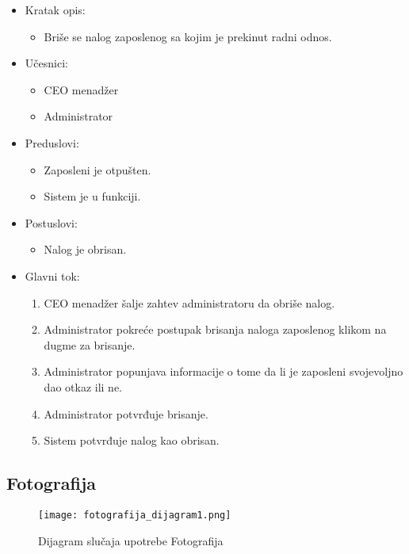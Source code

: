 \documentclass[a4paper]{article}
\begin{document}
\begin{itemize}
    \item Kratak opis: 
    \begin{itemize}
        \item Briše se nalog zaposlenog sa kojim je prekinut radni odnos.
    \end{itemize}
    \item Učesnici:
        \begin{itemize}
        \item CEO menadžer
        \item Administrator
    \end{itemize}
    \item Preduslovi:
        \begin{itemize}
            \item Zaposleni je otpušten.
            \item Sistem je u funkciji.
        \end{itemize}
    \item Postuslovi:
        \begin{itemize}
            \item Nalog je obrisan.
        \end{itemize}
    \item Glavni tok:
        \begin{enumerate}
            \item CEO menadžer šalje zahtev administratoru da obriše nalog.
            \item Administrator pokreće postupak brisanja naloga zaposlenog klikom na dugme za brisanje.
            \item Administrator popunjava informacije o tome da li je zaposleni svojevoljno dao otkaz ili ne.
            \item Administrator potvrđuje brisanje.
            \item Sistem potvrđuje nalog kao obrisan.
        \end{enumerate}
\end{itemize}




\subsection{Fotografija}

\begin{figure}[htp]
    \centering
    \texttt{[image: fotografija\_dijagram1.png]}
    \caption{Dijagram slučaja upotrebe Fotografija}
    \label{fig:PrenosiviBar}
\end{figure}
\end{document}
